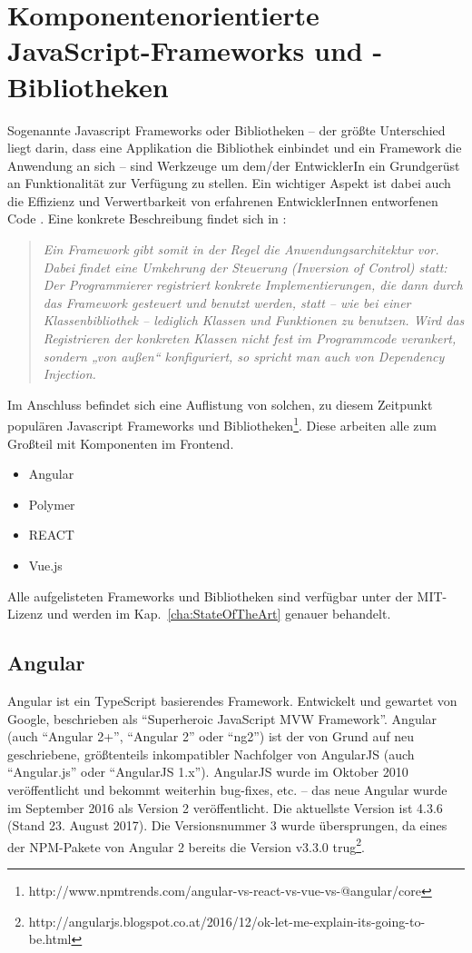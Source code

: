 \section{Komponentenorientierte JavaScript-Frameworks und -Bibliotheken}
Sogenannte Javascript Frameworks oder Bibliotheken -- der größte Unterschied liegt darin, dass eine Applikation die Bibliothek einbindet und ein Framework die Anwendung an sich -- sind Werkzeuge um dem/der EntwicklerIn ein Grundgerüst an Funktionalität zur Verfügung zu stellen. Ein wichtiger Aspekt ist dabei auch die Effizienz und Verwertbarkeit von erfahrenen EntwicklerInnen entworfenen Code \cite{js-frameworks}.
Eine konkrete Beschreibung findet sich in \cite{wiki-framework}: 
\begin{quote}\textit{Ein Framework gibt somit in der Regel die Anwendungsarchitektur vor. Dabei findet eine Umkehrung der Steuerung (Inversion of Control) statt: Der Programmierer registriert konkrete Implementierungen, die dann durch das Framework gesteuert und benutzt werden, statt – wie bei einer Klassenbibliothek – lediglich Klassen und Funktionen zu benutzen. Wird das Registrieren der konkreten Klassen nicht fest im Programmcode verankert, sondern „von außen“ konfiguriert, so spricht man auch von Dependency Injection.}
\end{quote}

Im Anschluss befindet sich eine Auflistung von solchen, zu diesem Zeitpunkt populären Javascript Frameworks und Bibliotheken\footnote{http://www.npmtrends.com/angular-vs-react-vs-vue-vs-@angular/core}. Diese arbeiten alle zum Großteil mit Komponenten im Frontend.
\begin{itemize}  
	\item Angular
	\item Polymer
	\item REACT
	\item Vue.js
\end{itemize}
Alle aufgelisteten Frameworks und Bibliotheken sind verfügbar unter der MIT-Lizenz und werden im Kap.~\ref{cha:StateOfTheArt} genauer behandelt.

\subsection{Angular}
Angular ist ein TypeScript basierendes Framework. Entwickelt und gewartet von Google, beschrieben als "`Superheroic JavaScript MVW Framework"'. Angular (auch "`Angular 2+"', "`Angular 2"' oder "`ng2"') ist der von Grund auf neu geschriebene, größtenteils inkompatibler Nachfolger von AngularJS (auch "`Angular.js"' oder "`AngularJS 1.x"').
AngularJS wurde im Oktober 2010 veröffentlicht und bekommt weiterhin bug-fixes, etc. -- das neue Angular wurde im September 2016 als Version 2 veröffentlicht. Die aktuellste Version ist 4.3.6 (Stand 23. August 2017). Die Versionsnummer 3 wurde übersprungen, da eines der NPM-Pakete von Angular 2 bereits die Version v3.3.0 trug\footnote{http://angularjs.blogspot.co.at/2016/12/ok-let-me-explain-its-going-to-be.html}.

